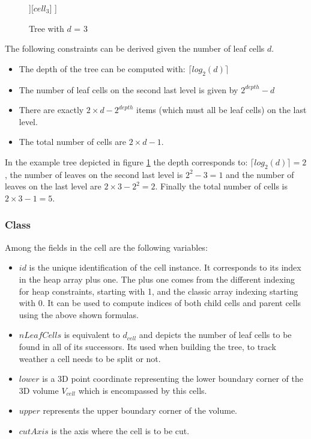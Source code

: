 \documentclass[]{article}
\begin{document}
\begin{figure}[H]
	\centering
	\begin{forest}
		[$cell_1$
		[$cell_2$ [$cell_4$] [$cell_5$]][$cell_3$]  
		]
	\end{forest}
	\caption{Tree with $d$ = 3}
	\label{fig:extree}
\end{figure}

\vspace{0.5cm}
The following constraints can be derived given the number of leaf cells $d$. 

\begin{itemize}
	\item The depth of the tree can be computed with: $\lceil log_2(d) \rceil$
	\item The number of leaf cells on the second last level is given by $2^{depth} - d$ 
	\item There are exactly $2 \times d - 2^{depth}$ items (which must all be leaf cells) on the last level. 
	\item The total number of cells are $2\times d - 1$.
\end{itemize}

In the example tree depicted in figure \ref{fig:extree} the depth corresponds to: $\lceil log_2(d) \rceil = 2$, the number of leaves on the second last level is  $2^{2} - 3 = 1$ and the number of leaves on the last level are $2 \times 3 - 2^{2} = 2$. Finally the total number of cells is $2\times 3 - 1 = 5$.

\subsubsection{Class}
Among the fields in the cell are the following variables:

\begin{itemize}
	\item $id$ is the unique identification of the cell instance. It corresponds to its index in the heap array plus one. The plus one comes from the different indexing for heap constraints, starting with 1, and the classic array indexing starting with 0. It can be used to compute  indices of both child cells and parent cells using the above shown formulas.
	\item $nLeafCells$ is equivalent to  $d_{cell}$ and depicts the number of leaf cells to be found in all of its successors. Its used when building the tree, to track weather a cell needs to be split or not. 
	\item $lower$ is a 3D point coordinate representing the lower boundary corner of the 3D volume $V_{cell}$ which is encompassed by this cells.
	\item $upper$ represents the upper boundary corner of the volume.	
	\item $cutAxis$ is the axis where the cell is to be cut. 
\end{itemize}
\end{document}
